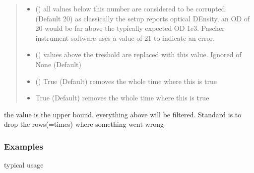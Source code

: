 \documentclass[letterpaper,10pt,english]{sphinxmanual}
\begin{document}
\begin{fulllineitems}
\begin{fulllineitems}
\begin{quote}
\begin{description}
\begin{itemize}
\item {} 
 (\sphinxstyleliteralemphasis{\sphinxupquote{, }}) \textendash{} all values below this number are considered to be corrupted. (Default \sphinxhyphen{}20) as classically the setup
reports optical DEnsity, an OD of \sphinxhyphen{}20 would be far above the typically expected
OD 1e\sphinxhyphen{}3. Pascher instrument software uses a value of 21 to indicate an error.

\item {} 
 (\sphinxstyleliteralemphasis{\sphinxupquote{, }}) \textendash{} values above the treshold are replaced with this value. Ignored of None (Default)

\item {} 
 () \textendash{} True (Default) removes the whole time where this is true

\item {} 
 \textendash{} True (Default) removes the whole time where this is true

\end{itemize}

\end{description}\end{quote}

the value is the upper bound. everything
above will be filtered. Standard is to drop the rows(=times) where something went wrong
\subsubsection*{Examples}

typical usage

\begin{sphinxVerbatim}[commandchars=\\\{\}]
   
 
\end{sphinxVerbatim}


\end{fulllineitems}
\end{fulllineitems}
\end{document}
